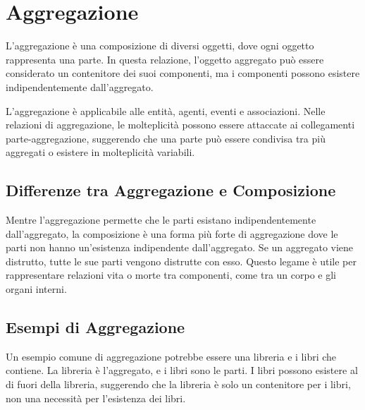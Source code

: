 \section{Aggregazione}
\begin{tcolorbox}[colback=teal!5!white,colframe=teal!75!black, title=Aggregazione]
    L'aggregazione è una composizione di diversi oggetti, dove ogni oggetto rappresenta una 
    parte. In questa relazione, l'oggetto aggregato può essere considerato un contenitore
    dei suoi componenti, ma i componenti possono esistere indipendentemente dall'aggregato.
\end{tcolorbox}
L'aggregazione è applicabile alle entità, agenti, eventi e associazioni.
Nelle relazioni di aggregazione, le molteplicità possono essere attaccate ai
collegamenti parte-aggregazione, suggerendo che una parte può essere condivisa
tra più aggregati o esistere in molteplicità variabili.
\begin{figure}[H]
    \centering
\end{figure}

\subsection{Differenze tra Aggregazione e Composizione}
Mentre l'aggregazione permette che le parti esistano indipendentemente dall'aggregato,
la composizione è una forma più forte di aggregazione dove le parti non hanno
un'esistenza indipendente dall'aggregato. Se un aggregato viene distrutto, tutte
le sue parti vengono distrutte con esso. Questo legame è utile per rappresentare
relazioni vita o morte tra componenti, come tra un corpo e gli organi interni.

\subsection{Esempi di Aggregazione}
Un esempio comune di aggregazione potrebbe essere una libreria e i libri che
contiene. La libreria è l'aggregato, e i libri sono le parti. I libri possono
esistere al di fuori della libreria, suggerendo che la libreria è solo un
contenitore per i libri, non una necessità per l'esistenza dei libri.

